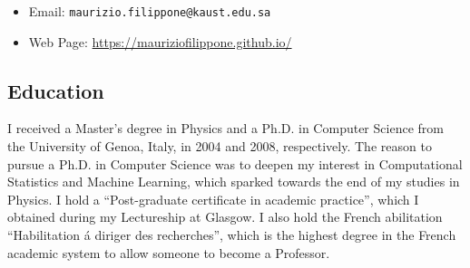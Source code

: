 \documentclass[oneside, a4paper, onecolumn, 10pt]{article}
\title{\mytitle}
\author{Maurizio Filippone} %
\newcommand{\mytitle}[0]{CURRICULUM VITAE}
\begin{document}
\begin{center}
  {\Large {\color{MidnightBlue}{\bf \mytitle}}\par}
\end{center}

\begin{center}
  {{\color{MidnightBlue}{\bf Maurizio Filippone}}\par}
\end{center}


\linespread{0.9}
\selectfont

\begin{itemize}
\item Email:              \texttt{maurizio.filippone@kaust.edu.sa}
\item Web Page:           \url{https://mauriziofilippone.github.io/}
\end{itemize}



\subsection*{Education}

I received a Master's degree in Physics and a Ph.D. in Computer Science from the University of Genoa, Italy, in 2004 and 2008, respectively.
The reason to pursue a Ph.D. in Computer Science was to deepen my interest in Computational Statistics and Machine Learning, which sparked towards the end of my studies in Physics.
I hold a ``Post-graduate certificate in academic practice'', which I obtained during my Lectureship at Glasgow.
I also hold the French abilitation ``Habilitation \'a diriger des recherches'', which is the highest degree in the French academic system to allow someone to become a Professor.


\end{document}
